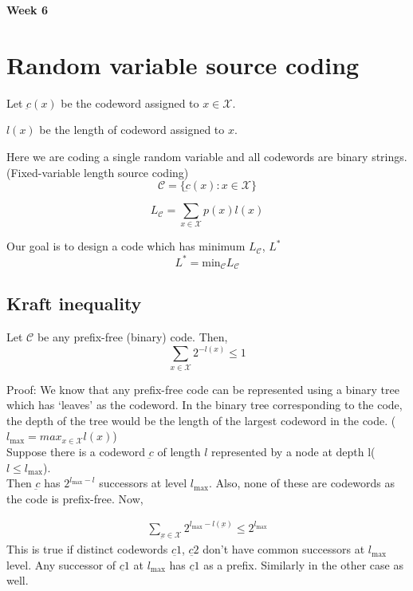 \documentclass{article}
\begin{document}
\begin{center}
\textbf{\huge{Week 6}}
\end{center}

\section{Random variable source coding}

Let $\underbar{c}(x)$ be the codeword assigned to $x \in \mathcal{X}$.

$l(x)$ be the length of codeword assigned to $x$.

Here we are coding a single random variable and all codewords are binary strings. (Fixed-variable length source coding)
$$ \mathscr{C}= \{ \underbar{c}(x): x \in \mathcal{X}\}$$

$$ L_{\mathscr{C}}= \sum_{x \in \mathcal{X}}p(x)l(x)$$

Our goal is to design a code which has minimum $L_{\mathscr{C}}$, $L^{*}$
$$L^{*} = \text{min}_{\mathscr{C}} L_{\mathscr{C}}$$

\subsection{Kraft inequality}

Let $\mathscr{C}$ be any prefix-free (binary) code. Then,
$$ \sum_{x \in \mathcal{X}} 2^{-l(x)} \leq 1$$

Proof: We know that any prefix-free code can be represented using a binary tree which has `leaves' as the codeword. In the binary tree corresponding to the code, the depth of the tree would be the length of the largest codeword in the code. ($l_{\text{max}}=max_{x \in \mathcal{X}} l(x)$)\\

Suppose there is a codeword $\underbar{c}$ of length $l$ represented by a node at depth l($l \leq l_{\text{max}}$).\\

Then $\underbar{c}$ has $2^{l_{\text{max}}-l}$ successors at level $l_{\text{max}}$. Also, none of these are codewords as the code is prefix-free. Now,

\begin{align}
    \sum_{\underbar{x} \in \mathcal{X}} 2^{l_{\text{max}}-l(\underbar{x})} \leq 2^{l_{\text{max}}}
\end{align}
This is true if distinct codewords $\underbar{c1}$, $\underbar{c2}$ don't have common successors at $l_{\text{max}}$ level. Any successor of $\underbar{c1}$ at $l_{\text{max}}$ has $\underbar{c1}$ as a prefix. Similarly in the other case as well.
\end{document}
